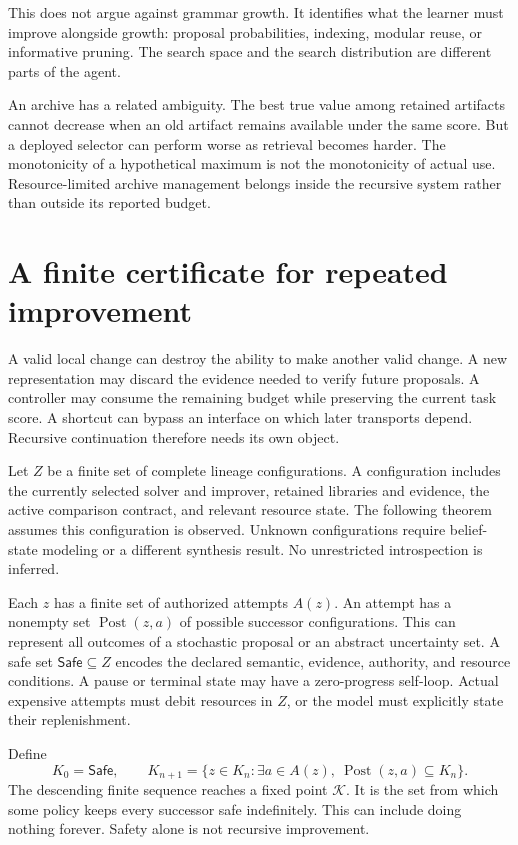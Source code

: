 \documentclass[11pt,letterpaper]{article}
\theoremstyle{plain}
\theoremstyle{definition}
\newcommand{\Safe}{\mathsf{Safe}}\newcommand{\Post}{\operatorname{Post}}\newcommand{\Pareto}{\operatorname{Pareto}}
\begin{document}
This does not argue against grammar growth. It identifies what the learner must improve alongside growth: proposal probabilities, indexing, modular reuse, or informative pruning. The search space and the search distribution are different parts of the agent.

An archive has a related ambiguity. The best true value among retained artifacts cannot decrease when an old artifact remains available under the same score. But a deployed selector can perform worse as retrieval becomes harder. The monotonicity of a hypothetical maximum is not the monotonicity of actual use. Resource-limited archive management belongs inside the recursive system rather than outside its reported budget.

\section{A finite certificate for repeated improvement}\label{sec:recursion}
A valid local change can destroy the ability to make another valid change. A new representation may discard the evidence needed to verify future proposals. A controller may consume the remaining budget while preserving the current task score. A shortcut can bypass an interface on which later transports depend. Recursive continuation therefore needs its own object.

Let $Z$ be a finite set of complete lineage configurations. A configuration includes the currently selected solver and improver, retained libraries and evidence, the active comparison contract, and relevant resource state. The following theorem assumes this configuration is observed. Unknown configurations require belief-state modeling or a different synthesis result. No unrestricted introspection is inferred.

Each $z$ has a finite set of authorized attempts $A(z)$. An attempt has a nonempty set $\Post(z,a)$ of possible successor configurations. This can represent all outcomes of a stochastic proposal or an abstract uncertainty set. A safe set $\Safe\subseteq Z$ encodes the declared semantic, evidence, authority, and resource conditions. A pause or terminal state may have a zero-progress self-loop. Actual expensive attempts must debit resources in $Z$, or the model must explicitly state their replenishment.

Define
\[
K_0=\Safe,\qquad
K_{n+1}=\{z\in K_n:\exists a\in A(z),\ \Post(z,a)\subseteq K_n\}.
\]
The descending finite sequence reaches a fixed point $\mathcal K$. It is the set from which some policy keeps every successor safe indefinitely. This can include doing nothing forever. Safety alone is not recursive improvement.
\end{document}
